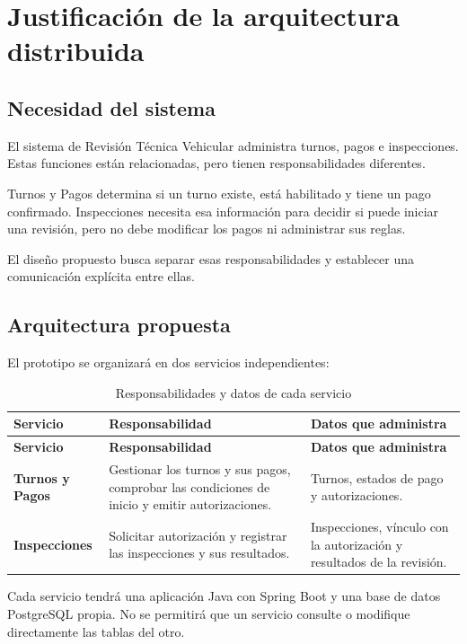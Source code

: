 \documentclass[11pt,a4paper]{article}
\begin{document}
	\section{Justificación de la arquitectura distribuida}
	\label{sec:justificacion}
	\subsection{Necesidad del sistema}
	
	El sistema de Revisión Técnica Vehicular administra turnos, pagos e inspecciones. Estas funciones están relacionadas, pero tienen responsabilidades diferentes.
	
	Turnos y Pagos determina si un turno existe, está habilitado y tiene un pago confirmado. Inspecciones necesita esa información para decidir si puede iniciar una revisión, pero no debe modificar los pagos ni administrar sus reglas.
	
	El diseño propuesto busca separar esas responsabilidades y establecer una comunicación explícita entre ellas.
	
	\subsection{Arquitectura propuesta}
	
	El prototipo se organizará en dos servicios independientes:
	
	\begin{xltabular}{\textwidth}{L{3.2cm}XX}
		\caption{Responsabilidades y datos de cada servicio}\label{tab:servicios}\\
		\toprule
		\textbf{Servicio} & \textbf{Responsabilidad} & \textbf{Datos que administra} \\
		\midrule
		\endfirsthead
		\toprule
		\textbf{Servicio} & \textbf{Responsabilidad} & \textbf{Datos que administra} \\
		\midrule
		\endhead
		\bottomrule
		\endfoot
		\textbf{Turnos y Pagos} & Gestionar los turnos y sus pagos, comprobar las condiciones de inicio y emitir autorizaciones. & Turnos, estados de pago y autorizaciones. \\
		\textbf{Inspecciones} & Solicitar autorización y registrar las inspecciones y sus resultados. & Inspecciones, vínculo con la autorización y resultados de la revisión. \\
	\end{xltabular}
	
	Cada servicio tendrá una aplicación Java con Spring Boot y una base de datos PostgreSQL propia. No se permitirá que un servicio consulte o modifique directamente las tablas del otro.
	
\end{document}
